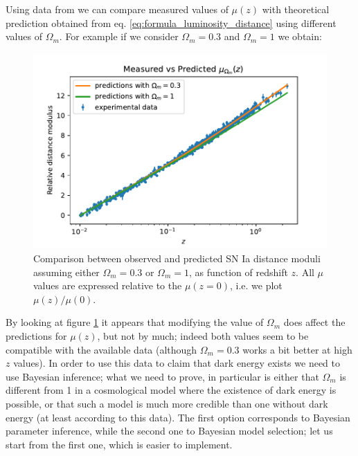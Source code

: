 Using data from \cite{dark_energy_data} we can compare measured values of $\mu(z)$ with theoretical prediction obtained from eq. \eqref{eq:formula_luminosity_distance} using different values of $\Omega_m$. For example if we consider $\Omega_m = 0.3$ and $\Omega_m = 1$ we obtain:
\begin{figure}[H]
    \centering
    \includegraphics[width=1.1\textwidth]{img/sn_data.pdf}
    \caption{Comparison between observed and predicted SN Ia distance moduli assuming either $\Omega_m=0.3$ or $\Omega_m=1$, as function of redshift $z$. All $\mu$ values are expressed relative to the $\mu(z=0)$, i.e. we plot $\mu(z)/\mu(0)$.}
    \label{fig:sn_data}
\end{figure}
By looking at figure \ref{fig:sn_data} it appears that modifying the value of $\Omega_m$ does affect the predictions for $\mu(z)$, but not by much; indeed both values seem to be compatible with the available data (although $\Omega_m=0.3$ works a bit better at high $z$ values). 
In order to use this data to claim that dark energy exists we need to use Bayesian inference; what we need to prove, in particular is either that $\Omega_m$ is different from 1 in a cosmological model where the existence of dark energy is possible, or that such a model is much more credible than one without dark energy (at least according to this data).
The first option corresponds to Bayesian parameter inference, while the second one to Bayesian model selection; let us start from the first one, which is easier to implement.


